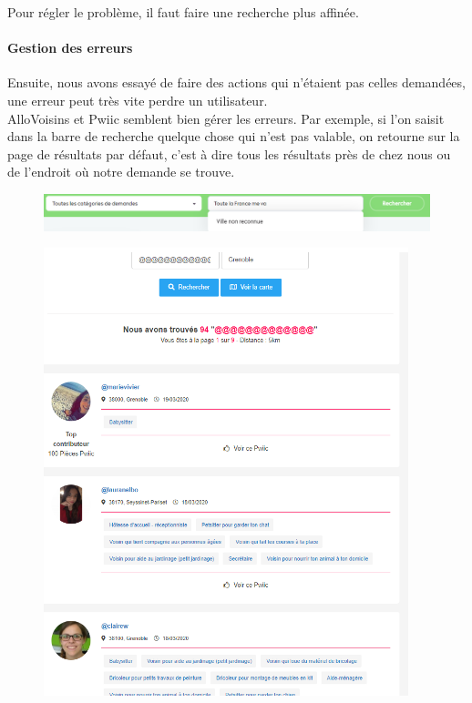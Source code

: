 \documentclass[a4paper,11pt]{article}
\begin{document}
Pour régler le problème, il faut faire une recherche plus affinée.\\

\paragraph{Gestion des erreurs}

Ensuite, nous avons essayé de faire des actions qui n’étaient pas celles demandées, une erreur peut très vite perdre un utilisateur.\\

AlloVoisins et Pwiic semblent bien gérer les erreurs. Par exemple, si l’on saisit dans la barre de recherche quelque chose
qui n’est pas valable, on retourne sur la page de résultats par défaut, c’est à dire tous les résultats près de
chez nous ou de l’endroit où notre demande se trouve.\\

\begin{figure}[H]
  \includegraphics[width=\linewidth]{images/gestion-erreur-allovoisins.png}
  \label{fig:gestion-erreur-allovoisins}
\end{figure}

\begin{figure}[H]
  \includegraphics[width=400px]{images/gestion-erreur-yakasaider.png}
  \label{fig:gestion-erreur-yakasaider}
\end{figure}
\end{document}
